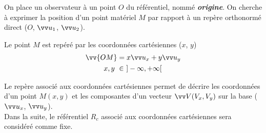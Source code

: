 \documentclass[10.5pt,a4paper]{book}
\begin{document}
On place un observateur à un point $O$ du référentiel, nommé \emph{\textbf{origine}}. On cherche à exprimer la position d'un point matériel $M$ par rapport à un repère orthonormé direct ($O$, $\vv u_1$, $\vv u_2$).

\begin{boite}

\begin{minipage}{.5\textwidth}
\end{minipage}
\hfill
\begin{minipage}{.48\textwidth}
\begin{flushleft}
Le point $M$ est repéré par les coordonnées cartésiennes ($x$, $y$)
\begin{align*}
 \vv{OM} &= x \vv u_x + y \vv u_y \\ x, y \ &\in \ ]-\infty, +\infty[
\end{align*}
\end{flushleft} 
\end{minipage}

Le repère associé aux coordonnées cartésiennes permet de décrire les coordonnées d’un point $M(x, y)$ et les composantes d’un vecteur $\vv V(V_x, V_y)$ sur la base ($\vv u_x$, $\vv u_y$).\\

Dans la suite, le référentiel $R_c$ associé aux coordonnées cartésiennes sera considéré comme fixe.
\end{boite}
\end{document}

